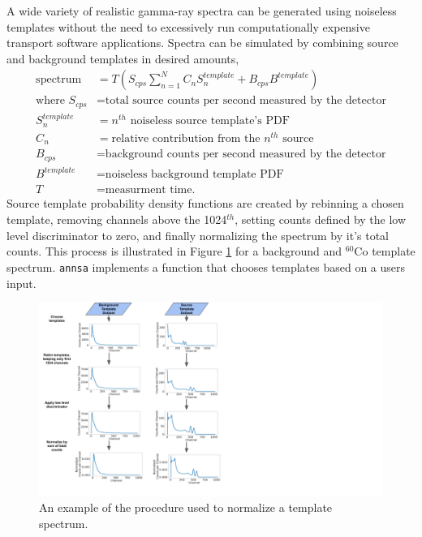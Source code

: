 A wide variety of realistic gamma-ray spectra can be generated using noiseless templates without the need to excessively run computationally expensive transport software applications. Spectra can be simulated by combining source and background templates in desired amounts,
%
\begin{align} \label{eq:template_sampling}
\text{spectrum} &= T ( S_{cps} \sum_{n=1}^{N} C_n S_{n}^{template}  + B_{cps} B^{template} ) \\
\text{where } S_{cps} &= \text{total source counts per second measured by the detector} \nonumber \\
S_{n}^{template} &= n^{th} \text{ noiseless source template's PDF} \nonumber \\
C_{n} &= \text{relative contribution from the $n^{th}$ source} \nonumber \\
B_{cps} &= \text{background counts per second measured by the detector} \nonumber \\
B^{template} &= \text{noiseless background template PDF} \nonumber \\
T &= \text{measurment time.} \nonumber 
\end{align}
%
Source template probability density functions are created by rebinning a chosen template, removing channels above the 1024$^{th}$, setting counts defined by the low level discriminator to zero, and finally normalizing the spectrum by it's total counts. This process is illustrated in Figure \ref{fig:template_manipulation} for a background and $^{60}$Co template spectrum. \verb|annsa| implements a function that chooses templates based on a users input.

\begin{figure}[H]
	\centering
	\includegraphics[trim=0 0 450 0,clip,width=1.0\linewidth]{images/template_manipulation.png}
	\caption{An example of the procedure used to normalize a template spectrum.}
	\label{fig:template_manipulation}
\end{figure}

